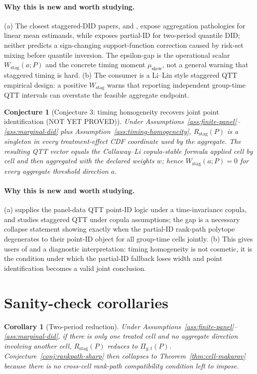 \documentclass[11pt]{article}
\theoremstyle{definition}
\theoremstyle{plain}
\newtheorem{conjecture}{Conjecture}
\newtheorem{corollary}{Corollary}
\theoremstyle{remark}
\begin{document}
\paragraph{Why this is new and worth studying.}
(a) The closest staggered-DID papers, \citet{GoodmanBacon2021} and \citet{SunAbraham2021}, expose aggregation pathologies for linear mean estimands, while \citet{FanYu2012} exposes partial-ID for two-period quantile DID; neither predicts a sign-changing support-function correction caused by risk-set mixing before quantile inversion.  The epsilon-gap is the operational scalar \(W_{\mathrm{stag}}(a;P)\) and the concrete timing moment \(\mu_{\mathrm{skew}}\), not a general warning that staggered timing is hard.  (b) The consumer is a Li--Lin style staggered QTT empirical design: a positive \(W_{\mathrm{stag}}\) warns that reporting independent group-time QTT intervals can overstate the feasible aggregate endpoint.

\begin{conjecture}[Conjecture 3: timing homogeneity recovers joint point identification (NOT YET PROVED)]\label{conj:timing-homogeneity}
Under Assumptions~\ref{ass:finite-panel}--\ref{ass:marginal-did} plus Assumption~\ref{ass:timing-homogeneity}, \(R_{\mathrm{stag}}(P)\) is a singleton in every treatment-effect CDF coordinate used by the aggregate.  The resulting QTT vector equals the Callaway--Li copula-stable formula applied cell by cell and then aggregated with the declared weights \(w\); hence \(W_{\mathrm{stag}}(a;P)=0\) for every aggregate threshold direction \(a\).
\end{conjecture}
\paragraph{Why this is new and worth studying.}
(a) \citet{CallawayLi2019} supplies the panel-data QTT point-ID logic under a time-invariance copula, and \citet{LiLin2024} studies staggered QTT under copula assumptions; the gap is a necessary collapse statement showing exactly when the partial-ID rank-path polytope degenerates to their point-ID object for all group-time cells jointly.  (b) This gives users of \citet{CallawayLi2019} and \citet{LiLin2024} a diagnostic interpretation: timing homogeneity is not cosmetic, it is the condition under which the partial-ID fallback loses width and point identification becomes a valid joint conclusion.

\section{Sanity-check corollaries}
\begin{corollary}[Two-period reduction]\label{cor:twoperiod}
Under Assumptions~\ref{ass:finite-panel}--\ref{ass:marginal-did}, if there is only one treated cell and no aggregate direction involving another cell, \(R_{\mathrm{stag}}(P)\) reduces to \(\Pi_{g,t}(P)\).  Conjecture~\ref{conj:rankpath-sharp} then collapses to Theorem~\ref{thm:cell-makarov} because there is no cross-cell rank-path compatibility condition left to impose.
\end{corollary}
\end{document}
